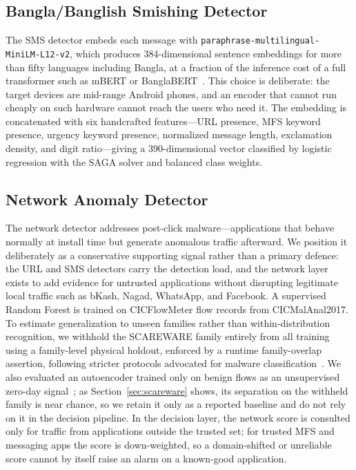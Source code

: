 \documentclass[preprint,12pt,number]{elsarticle}
\begin{document}
\subsection{Bangla/Banglish Smishing Detector}
The SMS detector embeds each message with \texttt{paraphrase-multilingual-MiniLM-L12-v2}, which produces 384-dimensional sentence embeddings for more than fifty languages including Bangla, at a fraction of the inference cost of a full transformer such as mBERT or BanglaBERT~\cite{reimers2020}. This choice is deliberate: the target devices are mid-range Android phones, and an encoder that cannot run cheaply on such hardware cannot reach the users who need it. The embedding is concatenated with six handcrafted features---URL presence, MFS keyword presence, urgency keyword presence, normalized message length, exclamation density, and digit ratio---giving a 390-dimensional vector classified by logistic regression with the SAGA solver and balanced class weights.

\subsection{Network Anomaly Detector}
The network detector addresses post-click malware---applications that behave normally at install time but generate anomalous traffic afterward. We position it deliberately as a conservative supporting signal rather than a primary defence: the URL and SMS detectors carry the detection load, and the network layer exists to add evidence for untrusted applications without disrupting legitimate local traffic such as bKash, Nagad, WhatsApp, and Facebook. A supervised Random Forest is trained on CICFlowMeter flow records from CICMalAnal2017. To estimate generalization to unseen families rather than within-distribution recognition, we withhold the SCAREWARE family entirely from all training using a family-level physical holdout, enforced by a runtime family-overlap assertion, following stricter protocols advocated for malware classification~\cite{taheri2019,pendlebury2019}. We also evaluated an autoencoder trained only on benign flows as an unsupervised zero-day signal~\cite{sakurada2014}; as Section~\ref{sec:scareware} shows, its separation on the withheld family is near chance, so we retain it only as a reported baseline and do not rely on it in the decision pipeline. In the decision layer, the network score is consulted only for traffic from applications outside the trusted set; for trusted MFS and messaging apps the score is down-weighted, so a domain-shifted or unreliable score cannot by itself raise an alarm on a known-good application.
\end{document}

